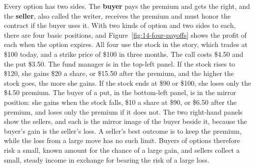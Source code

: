Every option has two sides. The \textbf{buyer} pays the premium and gets the right, and the \textbf{seller}, also called the writer, receives the premium and must honor the contract if the buyer uses it. With two kinds of option and two sides to each, there are four basic positions, and Figure~\ref{fig:14-four-payoffs} shows the profit of each when the option expires. All four use the stock in the story, which trades at \$100 today, and a strike price of \$100 in three months. The call costs \$4.50 and the put \$3.50. The fund manager is in the top-left panel. If the stock rises to \$120, she gains \$20 a share, or \$15.50 after the premium, and the higher the stock goes, the more she gains. If the stock ends at \$90 or \$100, she loses only the \$4.50 premium. The buyer of a put, in the bottom-left panel, is in the mirror position: she gains when the stock falls, \$10 a share at \$90, or \$6.50 after the premium, and loses only the premium if it does not. The two right-hand panels show the sellers, and each is the mirror image of the buyer beside it, because the buyer's gain is the seller's loss. A seller's best outcome is to keep the premium, while the loss from a large move has no such limit. Buyers of options therefore risk a small, known amount for the chance of a large gain, and sellers collect a small, steady income in exchange for bearing the risk of a large loss.

